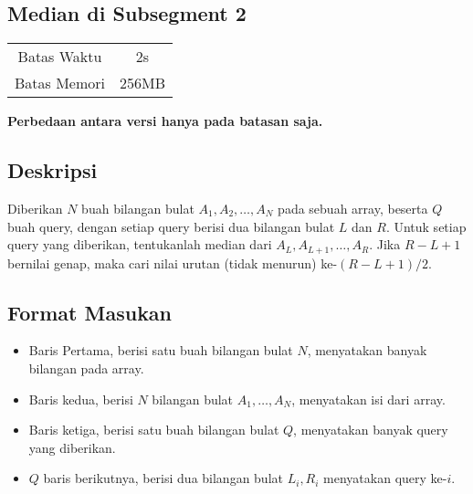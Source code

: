 \documentclass{article}
\begin{document}
\begin{center}
    \section*{Median di Subsegment 2} %

    \begin{tabular}{ | c c | }
        \hline
        Batas Waktu  & 2s \\    %
        Batas Memori & 256MB \\  %
        \hline
    \end{tabular}
\end{center}

\begin{center}
    \textbf{Perbedaan antara versi hanya pada batasan saja.}
\end{center}

\subsection*{Deskripsi}

Diberikan $N$ buah bilangan bulat $A_1, A_2, \dots, A_N$ pada sebuah array, beserta $Q$ buah query, dengan setiap query berisi dua bilangan bulat $L$ dan $R$. Untuk setiap query yang diberikan, tentukanlah median dari $A_L, A_{L + 1}, \dots, A_R$. Jika $R - L + 1$ bernilai genap, maka cari nilai urutan (tidak menurun) ke-$(R - L + 1) / 2$.

\subsection*{Format Masukan}
\begin{itemize}
\item{Baris Pertama, berisi satu buah bilangan bulat $N$, menyatakan banyak bilangan pada array.}

\item{Baris kedua, berisi $N$ bilangan bulat $A_1, \dots, A_N$, menyatakan isi dari array.}

\item{Baris ketiga, berisi satu buah bilangan bulat $Q$, menyatakan banyak query yang diberikan.}

\item{$Q$ baris berikutnya, berisi dua bilangan bulat $L_i, R_i$ menyatakan query ke-$i$.}

\end{itemize}
\end{document}
